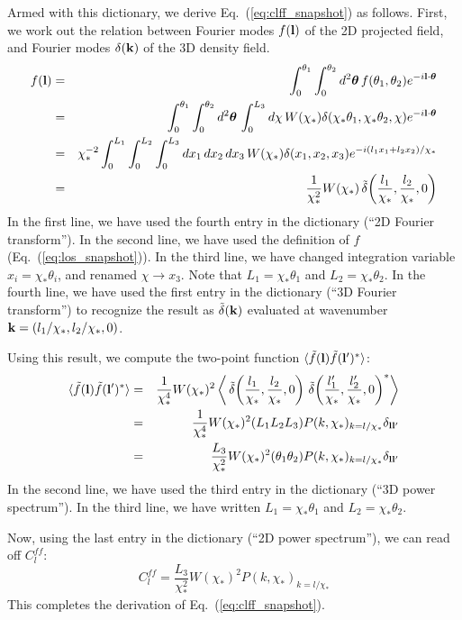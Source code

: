 \documentclass[aps,prd,superscriptaddress,groupedaddress,nofootinbib,nobibnotes]{revtex4}
\newcommand{\be}{\begin{equation}}
\newcommand{\ee}{\end{equation}}
\newcommand{\ba}{\begin{eqnarray}}
\newcommand{\ea}{\end{eqnarray}}
\newcommand{\nn}{\nonumber}
\def\k{{\bf k}}
\def\l{{\bf l}}
\def\th{{\bm{\theta}}}
\def\tdelta{\tilde\delta}
\def\tf{\tilde f}
\begin{document}
Armed with this dictionary, we derive Eq.~(\ref{eq:clff_snapshot}) as follows.
First, we work out the relation between Fourier modes $f(\l)$ of the 2D projected field,
and Fourier modes $\delta(\k)$ of the 3D density field.
\ba
f(\l)
  &=& \int_0^{\theta_1} \int_0^{\theta_2} d^2\th \, f(\theta_1,\theta_2) e^{-i\l\cdot\th} \nn \\
  &=& \int_0^{\theta_1} \int_0^{\theta_2} d^2\th \, \int_0^{L_3} d\chi \, W(\chi_*) \delta(\chi_*\theta_1, \chi_*\theta_2, \chi) e^{-i\l\cdot\th} \nn \\
  &=& \chi_*^{-2} \int_0^{L_1} \int_0^{L_2} \int_0^{L_3} dx_1 \, dx_2 \, dx_3 \, W(\chi_*) \delta(x_1, x_2, x_3) e^{-i(l_1 x_1 + l_2 x_2) / \chi_*} \nn \\
  &=& \frac{1}{\chi_*^2} W(\chi_*) \, \tdelta\!\left( \frac{l_1}{\chi_*}, \frac{l_2}{\chi_*}, 0 \right) 
\ea
In the first line, we have used the fourth entry in the dictionary (``2D Fourier transform'').
In the second line, we have used the definition of $f$ (Eq.~(\ref{eq:los_snapshot})).
In the third line, we have changed integration variable $x_i = \chi_* \theta_i$, and renamed $\chi \rightarrow x_3$.
Note that $L_1 = \chi_* \theta_1$ and $L_2 = \chi_* \theta_2$.
In the fourth line, we have used the first entry in the dictionary (``3D Fourier transform'')
to recognize the result as $\tdelta(\k)$ evaluated at wavenumber $\k = (l_1/\chi_*, l_2/\chi_*, 0)$.

Using this result, we compute the two-point function $\langle \tf(\l) \tf(\l')^* \rangle$:
\ba
\langle \tf(\l) \tf(\l')^* \rangle
  &=& \frac{1}{\chi_*^4} W(\chi_*)^2 \left\langle 
      \, \tdelta\!\left( \frac{l_1}{\chi_*}, \frac{l_2}{\chi_*}, 0 \right) 
      \, \tdelta\!\left( \frac{l_1'}{\chi_*}, \frac{l_2'}{\chi_*}, 0 \right)^*
   \right\rangle \nn \\
  &=& \frac{1}{\chi_*^4} W(\chi_*)^2 (L_1L_2L_3) P(k,\chi_*)_{k=l/\chi_*} \delta_{\l\l'} \nn \\
  &=& \frac{L_3}{\chi_*^2} W(\chi_*)^2 (\theta_1\theta_2) P(k,\chi_*)_{k=l/\chi_*} \delta_{\l\l'}
\ea
In the second line, we have used the third entry in the dictionary (``3D power spectrum'').
In the third line, we have written $L_1 = \chi_* \theta_1$ and $L_2 = \chi_* \theta_2$.

Now, using the last entry in the dictionary (``2D power spectrum''), we can read off $C_l^{ff}$:
\be
C_l^{ff} = \frac{L_3}{\chi_*^2} W(\chi_*)^2 P(k,\chi_*)_{k=l/\chi_*}
\ee
This completes the derivation of Eq.~(\ref{eq:clff_snapshot}).
\end{document}
